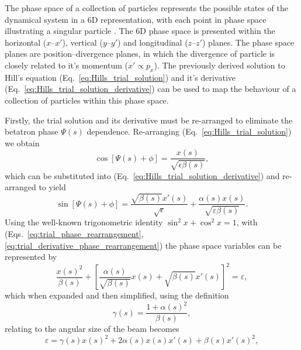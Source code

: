 \documentclass[../main.tex]{subfiles}
\begin{document}
The phase space of a collection of particles represents the possible states of the dynamical system in a 6D representation, with each point in phase space illustrating a singular particle \cite{jones2016design}. The 6D phase space is presented within the horizontal ($x$--$x'$), vertical ($y$--$y'$) and longitudinal ($z$--$z'$) planes. The phase space planes are position--divergence planes, in which the divergence of particle is closely related to it's momentum ($x' \propto p_{x}$). The previously derived solution to Hill's equation (Eq.~\ref{eq:Hills_trial_solution}) and it's derivative (Eq.~\ref{eq:Hills_trial_solution_derivative}) can be used to map the behaviour of a collection of particles within this phase space. 

Firstly, the trial solution and its derivative must be re-arranged to eliminate the betatron phase $\Psi\left(s\right)$ dependence. Re-arranging (Eq.~\ref{eq:Hills_trial_solution}) we obtain
\begin{equation}
\cos\left[\Psi\left(s\right)+\phi\right] = \frac{x\left(s\right)}{\sqrt{\epsilon\beta\left(s\right)}},
\label{eq:trial_phase_rearrangement}    
\end{equation}
which can be substituted into (Eq.~\ref{eq:Hills_trial_solution_derivative}) and re-arranged to yield
\begin{equation}
\sin\left[\Psi\left(s\right)+\phi\right] = \frac{\sqrt{\beta\left(s\right)}x'\left(s\right)}{\sqrt{\epsilon}} + \frac{\alpha\left(s\right)x\left(s\right)}{\sqrt{\varepsilon\beta\left(s\right)}}.
\label{eq:trial_derivative_phase_rearrangement}    
\end{equation}
Using the well-known trigonometric identity $\sin^{2}x+\cos^{2}x=1$, with (Eqs.~\ref{eq:trial_phase_rearrangement}, \ref{eq:trial_derivative_phase_rearrangement}) the phase space variables can be represented by
\begin{equation}
\frac{x\left(s\right)^{2}}{\beta\left(s\right)}+\left[\frac{\alpha\left(s\right)}{\sqrt{\beta\left(s\right)}}x\left(s\right)+\sqrt{\beta\left(s\right)}x'\left(s\right)\right]^{2} = \varepsilon,    
\label{eq:phase_space_trigonometry}
\end{equation}
which when expanded and then simplified, using the definition
\begin{equation}
\gamma\left(s\right) = \frac{1+\alpha\left(s\right)^{2}}{\beta\left(s\right)},
\label{eq:gamma_twiss}    
\end{equation}
relating to the angular size of the beam becomes
\begin{equation}
\varepsilon = \gamma\left(s\right)x\left(s\right)^{2}+2\alpha\left(s\right)x\left(s\right)x'\left(s\right)+\beta\left(s\right)x'\left(s\right)^{2},
\label{eq:phase_space_ellipse}    
\end{equation}
\end{document}
